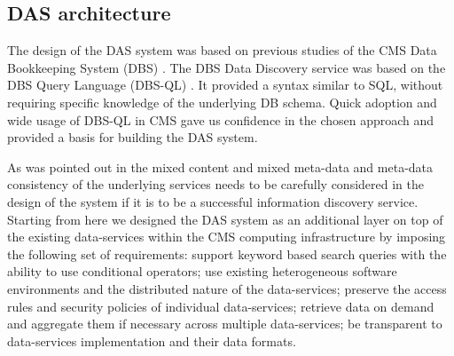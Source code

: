 \documentclass[3p,times]{elsarticle}
\begin{document}

\subsection{DAS architecture}
The design of the DAS system was based on previous studies of the CMS Data 
Bookkeeping System (DBS) \cite{DBS, DBS07}. The DBS Data Discovery service
\cite{DD} was based on the DBS Query Language (DBS-QL) \cite{DBS-QL}. It provided
a syntax similar to SQL, without requiring specific knowledge of the underlying DB schema.
Quick adoption and wide usage of DBS-QL in CMS gave us confidence in the chosen approach 
and provided a basis for building the DAS system.

As was pointed out in \cite{Arms} the mixed content and 
mixed meta-data and meta-data consistency 
of the underlying services needs to be carefully
considered in the design of the system if it is to be a successful information 
discovery service.
Starting from here we designed the DAS system as an
additional layer on top of the existing data-services
within the CMS computing infrastructure by imposing the following set of requirements:
support keyword based search queries with the ability to use conditional operators;
use existing heterogeneous software environments and the
distributed nature of the data-services;
preserve the access rules and security policies of individual data-services;
retrieve data on demand and aggregate them if necessary across
multiple data-services;
be transparent to data-services implementation and their data formats.
\end{document}

